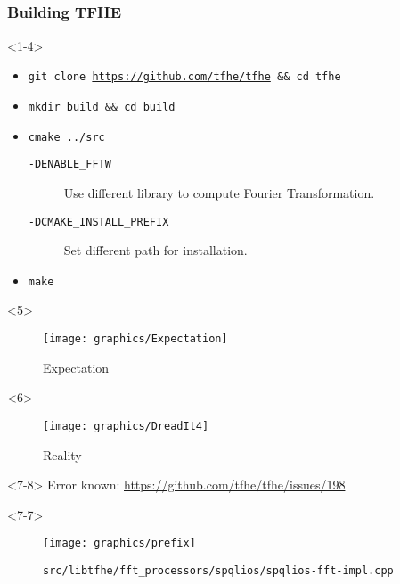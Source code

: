 \documentclass[lualatex, 9pt,serif]{beamer}
\newenvironment{cframe}[1]{
\begin{frame}
\frametitle{#1} } 
{
\end{frame}
}
\begin{document}
\subsection[Build]{}	
\begin{cframe}{Building TFHE}
	\begin{onlyenv}<1-4>
		\begin{itemize}
			\item<1-4> \texttt{git clone \textcolor{blue}{\url{https://github.com/tfhe/tfhe}} \&\& cd tfhe}
			\item<2-4> \texttt{mkdir build \&\& cd build}
			\item<3-4> \texttt{cmake ../src} \\ \begin{description}
				\item[\texttt{-DENABLE\_FFTW}] Use different library to compute Fourier Transformation.
				\item[\texttt{-DCMAKE\_INSTALL\_PREFIX}] Set different path for installation.
			\end{description}
			\item<4-4> \texttt{make}
		\end{itemize}
	\end{onlyenv}

	\begin{onlyenv}
		\begin{figure}
		\texttt{[image: graphics/Expectation]}
		\caption*{Expectation}
		\end{figure}
	\end{onlyenv}

	\begin{onlyenv}
		\begin{figure}
				\hspace*{0cm}\texttt{[image: graphics/DreadIt4]}
		\caption*{Reality}
		\end{figure}
		
	\end{onlyenv}

	\begin{onlyenv}<7-8>
		Error known: \textcolor{blue}{\url{https://github.com/tfhe/tfhe/issues/198}} 
		\vspace*{0.5cm}		
	\end{onlyenv}
	
	\begin{onlyenv}<7-7>
		\begin{figure}
		\texttt{[image: graphics/prefix]}
		\caption*{\texttt{src/libtfhe/fft\_processors/spqlios/spqlios-fft-impl.cpp}}
		\end{figure}
	\end{onlyenv}


\end{cframe}
\end{document}
